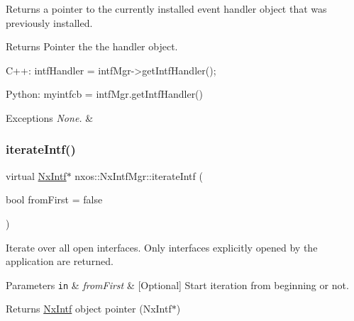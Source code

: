Returns a pointer to the currently installed event handler object that was previously installed. ~\newline
 \begin{DoxyReturn}{Returns}
Pointer the the handler object.
\end{DoxyReturn}

\begin{DoxyCode}
C++:
     intfHandler = intfMgr->getIntfHandler();

Python:
     myintfcb = intfMgr.getIntfHandler()
\end{DoxyCode}



\begin{DoxyExceptions}{Exceptions}
{\em None.} & \\
\hline
\end{DoxyExceptions}
\mbox{\label{classnxos_1_1_nx_intf_mgr_acbe3d94cba5b7982d80cc498d7fcbdf7}} 
\subsubsection{\texorpdfstring{iterate\+Intf()}{iterateIntf()}}
{\footnotesize\ttfamily virtual \mbox{\hyperlink{classnxos_1_1_nx_intf}{Nx\+Intf}}$\ast$ nxos\+::\+Nx\+Intf\+Mgr\+::iterate\+Intf (\begin{DoxyParamCaption}\item[{bool}]{from\+First = {\ttfamily false} }\end{DoxyParamCaption})\hspace{0.3cm}{\ttfamily [pure virtual]}}

Iterate over all open interfaces. Only interfaces explicitly opened by the application are returned. ~\newline

\begin{DoxyParams}[1]{Parameters}
\mbox{\tt in}  & {\em from\+First} & \mbox{[}Optional\mbox{]} Start iteration from beginning or not. \\
\hline
\end{DoxyParams}
\begin{DoxyReturn}{Returns}
\mbox{\hyperlink{classnxos_1_1_nx_intf}{Nx\+Intf}} object pointer (Nx\+Intf$\ast$)
\end{DoxyReturn}

